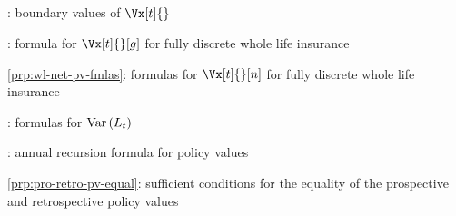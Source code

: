 \subsection*{}
\item {}: boundary values of \(\Vx[t]{}\)
\item {}: formula for \(\Vx[t]{}[g]\) for fully
discrete whole life insurance
\item \cref{prp:wl-net-pv-fmlas}: formulas for \(\Vx[t]{}[n]\) for fully
discrete whole life insurance
\item {}: formulas for \(\operatorname{Var}\qty(L_t)\)
\item {}: annual recursion formula for policy values
\item \cref{prp:pro-retro-pv-equal}: sufficient conditions for the equality of the prospective and retrospective policy values
